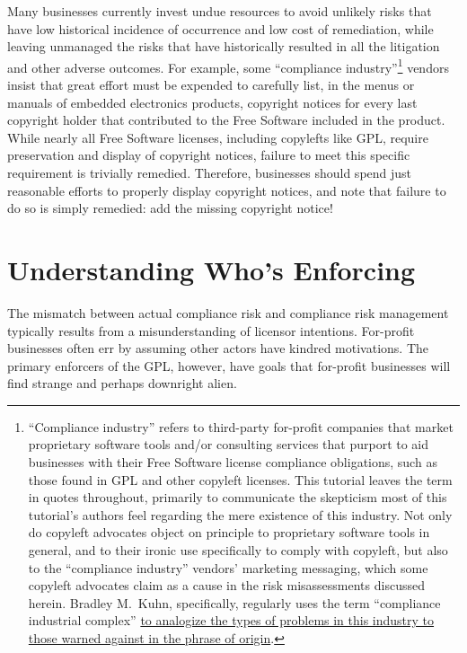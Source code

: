 Many businesses currently invest undue resources to avoid unlikely risks that
have low historical incidence of occurrence and low cost of remediation,
while leaving unmanaged the risks that have historically resulted in all the
litigation and other adverse outcomes.  For example, some ``compliance
industry''\footnote{``Compliance industry'' refers to third-party for-profit
  companies that market proprietary software tools and/or consulting services
  that purport to aid businesses with their Free Software license compliance
  obligations, such as those found in GPL and other copyleft licenses.  This
  tutorial leaves the term in quotes throughout, primarily to communicate the
  skepticism most of this tutorial's authors feel regarding the mere
  existence of this industry.  Not only do copyleft advocates object on
  principle to proprietary software tools in general, and to their ironic use
  specifically to comply with copyleft, but also to the ``compliance
  industry'' vendors' marketing messaging, which some copyleft advocates
  claim as a cause in the risk misassessments discussed herein.  Bradley
  M.~Kuhn, specifically, regularly uses the term ``compliance industrial
  complex''
  \href{http://en.wikipedia.org/wiki/Military-industrial_complex}{to
    analogize the types of problems in this industry to those warned against
    in the phrase of origin}.} vendors insist that great effort must be
expended to carefully list, in the menus or manuals of embedded electronics
products, copyright notices for every last copyright holder that contributed
to the Free Software included in the product.  While nearly all Free Software
licenses, including copylefts like GPL, require preservation and display of
copyright notices, failure to meet this specific requirement is trivially
remedied.  Therefore, businesses should spend just reasonable efforts to
properly display copyright notices, and note that failure to do so is simply
remedied: add the missing copyright notice!

\section{Understanding Who's Enforcing}
\label{compliance-understanding-whos-enforcing}

The mismatch between actual compliance risk and compliance risk management
typically results from a misunderstanding of licensor intentions.  For-profit
businesses often err by assuming other actors have kindred motivations.  The
primary enforcers of the GPL, however, have goals that for-profit businesses
will find strange and perhaps downright alien.

